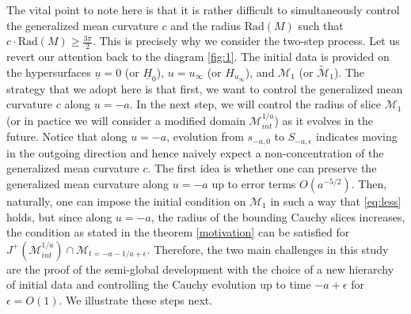 \documentclass{amsart}
\newcommand{\Hbar}{\underline{H}}
\newcommand{\ubar}{\underline{u}}
\begin{document}
\noindent The vital point to note here is that it is rather difficult to simultaneously control the generalized mean curvature $c$ and the radius $\text{Rad}(M)$ such that $c\cdot \text{Rad}(M)\geq \frac{3\pi}{2}$. This is precisely why we consider the two-step process. Let us revert our attention back to the diagram \ref{fig:1}. The initial data is provided on the hypersurfaces $\ubar=0$ (or $\Hbar_{0}$), $u=u_{\infty}$ (or $H_{u_{\infty}}$), and $\mathcal{M}_{1}$ (or $\widetilde{\mathcal{M}}_{1}$). The strategy that we adopt here is that first, we want to control the generalized mean curvature $c$ along $u=-a$. In the next step, we will control the radius of slice $\mathcal{M}_{1}$ (or in pactice we will consider a modified domain $\mathcal{M}^{1/a}_{int}$) as it evolves in the future. Notice that along $u=-a$, evolution from $s_{-a,0}$ to $S_{-a,\epsilon}$ indicates moving in the outgoing direction and hence naively expect a non-concentration of the generalized mean curvature $c$. The first idea is whether one can preserve the generalized mean curvature along $u=-a$ up to error terms $O(a^{-5/2})$. Then, naturally, one can impose the initial condition on $\mathcal{M}_{1}$ in such a way that \ref{eq:less} holds, but since along $u=-a$, the radius of the bounding Cauchy slices increases, the condition as stated in the theorem \ref{motivation} can be satisfied for $J^{+}(\mathcal{M}^{1/a}_{int})\cap \mathcal{M}_{t=-a-1/a+\epsilon}$. Therefore, the two main challenges in this study are the proof of the semi-global development with the choice of a new hierarchy of initial data and controlling the Cauchy evolution up to time $-a+\epsilon$ for $\epsilon=O(1)$. We illustrate these steps next. 

\medskip
\end{document}
